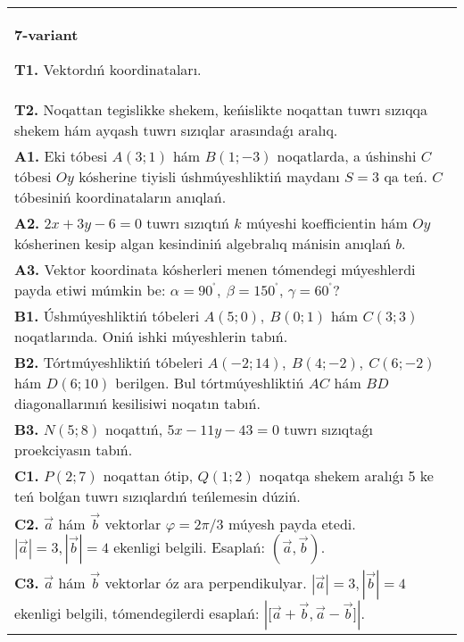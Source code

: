 \documentclass{article}
\begin{document}
\begin{tabular}{m{17cm}}
\textbf{7-variant}

\textbf{T1.} 
Vektordıń koordinataları.
 \\
\textbf{T2.} 
Noqattan tegislikke shekem, keńislikte noqattan tuwrı sızıqqa shekem hám ayqash tuwrı sızıqlar arasındaǵı aralıq.
 \\
\textbf{A1.} 
Eki tóbesi $A (3;1) $ hám $B (1;-3) $ noqatlarda, a
úshinshi $C$ tóbesi $Oy$ kósherine tiyisli úshmúyeshliktiń
maydanı $S=3$ qa teń. $C$ tóbesiniń koordinataların anıqlań.
 \\
\textbf{A2.} 
$2x+3y-6=0$ tuwrı sızıqtıń $k$ múyeshi
koefficientin hám $Oy$ kósherinen kesip algan kesindiniń algebralıq
mánisin anıqlań $b$.
 \\
\textbf{A3.} 
Vektor koordinata kósherleri menen tómendegi múyeshlerdi payda etiwi
múmkin be: $\alpha = 90^{{^\circ}},\ \beta = 150^{{^\circ}}$,
$\gamma = 60^{{^\circ}}?$
 \\
\textbf{B1.} 
Úshmúyeshliktiń tóbeleri \(A (5;0),\ B (0;1) \) hám \(C (3;3) \)
noqatlarında. Oniń ishki múyeshlerin tabıń.
 \\
\textbf{B2.} 
Tórtmúyeshliktiń tóbeleri
\(A (-2;14),\ B (4;-2),\ C (6;-2) \) hám \(D (6;10) \) berilgen. Bul
tórtmúyeshliktiń $AC$ hám $BD$ diagonallarınıń kesilisiwi
noqatın tabıń.
 \\
\textbf{B3.} 
\(N (5;8) \) noqattıń, \(5x-11y-43=0\) tuwrı sızıqtaǵı
proekciyasın tabıń.
 \\
\textbf{C1.} 
\(P (2;7) \) noqattan ótip, \(Q (1;2) \) noqatqa shekem
aralıǵı 5 ke teń bolǵan tuwrı sızıqlardıń teńlemesin dúziń.
 \\
\textbf{C2.} 
$\vec{a}$ hám $\vec{b}$ vektorlar $\varphi = 2\pi/3$ múyesh payda etedi. $|\vec{a}| = 3,|\vec{b}| = 4$ ekenligi belgili. Esaplań:
$\left(\vec{a},\vec{b} \right) $.
 \\
\textbf{C3.} 
$\vec{a}$ hám $\vec{b}$ vektorlar óz ara perpendikulyar. $|\vec{a}| = 3,|\vec{b}| = 4$ ekenligi belgili, tómendegilerdi esaplań:
$|\lbrack\vec{a} + \vec{b},\vec{a} - \vec{b}\rbrack|$.
 \\

\end{tabular}
\vspace{1cm}
\end{document}

